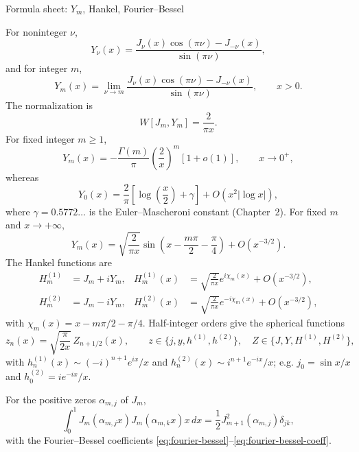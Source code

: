 \documentclass[11pt]{beamer}
\begin{document}
\begin{frame}[allowframebreaks=1.00]{Formula sheet: $Y_m$, Hankel, Fourier--Bessel}
\footnotesize

For noninteger $\nu$,
\[
  Y_\nu(x)=\frac{J_\nu(x)\cos(\pi\nu)-J_{-\nu}(x)}{\sin(\pi\nu)},
\]
and for integer $m$,
\[
 Y_m(x)=\lim_{\nu\to m}
 \frac{J_\nu(x)\cos(\pi\nu)-J_{-\nu}(x)}{\sin(\pi\nu)},\qquad x>0.
\]
The normalization is
\[
  W[J_m,Y_m]=\frac{2}{\pi x}.
\]
For fixed integer $m\ge1$,
\[
  Y_m(x)=-\frac{\Gamma(m)}{\pi}
  \left(\frac{2}{x}\right)^m[1+o(1)],
  \qquad x\to0^+,
\]
whereas
\[
  Y_0(x)=\frac{2}{\pi}
  \left[\log\left(\frac{x}{2}\right)+\gamma\right]
  +O(x^2|\log x|),
\]
where $\gamma=0.5772\ldots$ is the Euler--Mascheroni constant (Chapter~2).
For fixed $m$ and $x\to+\infty$,
\[
  Y_m(x)=\sqrt{\frac{2}{\pi x}}
  \sin\left(x-\frac{m\pi}{2}-\frac{\pi}{4}\right)
  +O(x^{-3/2}).
\]
The Hankel functions are
\begin{align*}
  H_m^{(1)}&=J_m+iY_m,
  &H_m^{(1)}(x)&=\sqrt{\frac{2}{\pi x}}e^{i\chi_m(x)}+O(x^{-3/2}),\\
  H_m^{(2)}&=J_m-iY_m,
  &H_m^{(2)}(x)&=\sqrt{\frac{2}{\pi x}}e^{-i\chi_m(x)}+O(x^{-3/2}),
\end{align*}
with $\chi_m(x)=x-m\pi/2-\pi/4$.
Half-integer orders give the spherical functions
\[
  z_n(x)=\sqrt{\frac{\pi}{2x}}\,Z_{n+1/2}(x),
  \qquad z\in\{j,y,h^{(1)},h^{(2)}\},\quad Z\in\{J,Y,H^{(1)},H^{(2)}\},
\]
with $h_n^{(1)}(x)\sim(-i)^{n+1}e^{ix}/x$ and
$h_n^{(2)}(x)\sim i^{n+1}e^{-ix}/x$; e.g. $j_0=\sin x/x$ and
$h_0^{(2)}=ie^{-ix}/x$.

For the positive zeros $\alpha_{m,j}$ of $J_m$,
\[
  \int_0^1J_m(\alpha_{m,j}x)J_m(\alpha_{m,k}x)x\,dx
  =\frac12J_{m+1}^2(\alpha_{m,j})\delta_{jk},
\]
with the Fourier--Bessel coefficients
\eqref{eq:fourier-bessel}--\eqref{eq:fourier-bessel-coeff}.
\end{frame}
\end{document}
